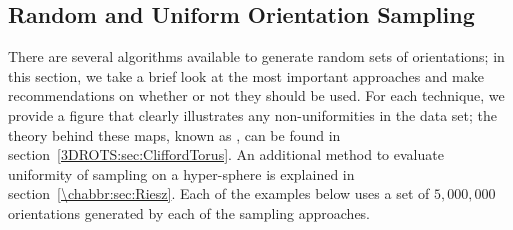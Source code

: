 %

\subsection{Random and Uniform Orientation Sampling}\label{\chabbr:ssec:randomsampling}
There are several algorithms available to generate random sets of orientations; in this section, we take a brief look at the most important approaches and make recommendations on whether or not they should be used. For each technique, we provide a figure that clearly illustrates any non-uniformities in the data set; the theory behind these maps, known as , can be found in section~\ref{3DROTS:sec:CliffordTorus}. An additional method to evaluate uniformity of sampling on a hyper-sphere is explained in section~\ref{\chabbr:sec:Riesz}.  Each of the examples below uses a set of $5,000,000$ orientations generated by each of the sampling approaches.

